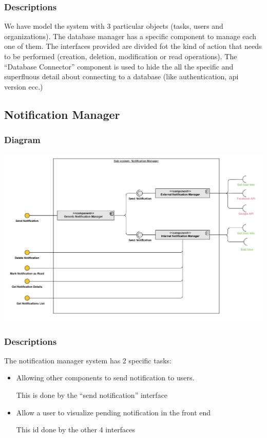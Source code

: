\documentclass{article}
\begin{document}
\subsubsection{Descriptions}

We have model the system with 3 particular objects (tasks, users and organizations).
The database manager has a specific component to manage each one of them. The interfaces provided
are divided fot the kind of action that needs to be performed (creation, deletion, modification or read operations).\newline
The ``Database Connector'' component is used to hide the all the specific and superfluous detail about connecting to a
database (like authentication, api version ecc.)

\subsection{Notification Manager}
\subsubsection{Diagram}
\includegraphics[width=\textwidth,height=\textheight,keepaspectratio]{images/component_diagram/notification_manager.jpg}
\subsubsection{Descriptions}
The notification manager system has 2 specific tasks:
\begin{itemize}
    \item Allowing other components to send notification to users.

          This is done by the ``send notification'' interface
    \item Allow a user to visualize pending notification in the front end

          This id done by the other 4 interfaces
\end{itemize}
\end{document}
